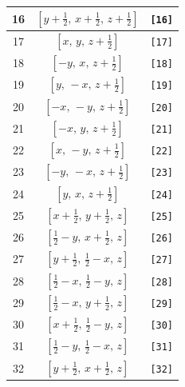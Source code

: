 \documentclass[fleqn,8pt]{jsarticle}
\begin{document}
\begin{longtable}{ccc}
16 & $\left[ y + \frac{1}{2},\, x + \frac{1}{2},\, z + \frac{1}{2} \right]$ & {\tt [16]} \\ \hline
17 & $\left[ x,\, y,\, z + \frac{1}{2} \right]$ & {\tt [17]} \\ \hline
18 & $\left[ - y,\, x,\, z + \frac{1}{2} \right]$ & {\tt [18]} \\ \hline
19 & $\left[ y,\, - x,\, z + \frac{1}{2} \right]$ & {\tt [19]} \\ \hline
20 & $\left[ - x,\, - y,\, z + \frac{1}{2} \right]$ & {\tt [20]} \\ \hline
21 & $\left[ - x,\, y,\, z + \frac{1}{2} \right]$ & {\tt [21]} \\ \hline
22 & $\left[ x,\, - y,\, z + \frac{1}{2} \right]$ & {\tt [22]} \\ \hline
23 & $\left[ - y,\, - x,\, z + \frac{1}{2} \right]$ & {\tt [23]} \\ \hline
24 & $\left[ y,\, x,\, z + \frac{1}{2} \right]$ & {\tt [24]} \\ \hline
25 & $\left[ x + \frac{1}{2},\, y + \frac{1}{2},\, z \right]$ & {\tt [25]} \\ \hline
26 & $\left[ \frac{1}{2} - y,\, x + \frac{1}{2},\, z \right]$ & {\tt [26]} \\ \hline
27 & $\left[ y + \frac{1}{2},\, \frac{1}{2} - x,\, z \right]$ & {\tt [27]} \\ \hline
28 & $\left[ \frac{1}{2} - x,\, \frac{1}{2} - y,\, z \right]$ & {\tt [28]} \\ \hline
29 & $\left[ \frac{1}{2} - x,\, y + \frac{1}{2},\, z \right]$ & {\tt [29]} \\ \hline
30 & $\left[ x + \frac{1}{2},\, \frac{1}{2} - y,\, z \right]$ & {\tt [30]} \\ \hline
31 & $\left[ \frac{1}{2} - y,\, \frac{1}{2} - x,\, z \right]$ & {\tt [31]} \\ \hline
32 & $\left[ y + \frac{1}{2},\, x + \frac{1}{2},\, z \right]$ & {\tt [32]} \\
\end{longtable}
\end{document}
